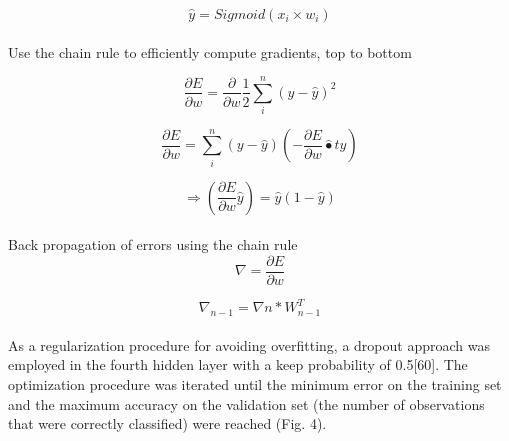 \documentclass{llncs}       %
\begin{document}
\begin{equation} 
\widehat{y}=Sigmoid(x_{i}\times w_{i})
\end{equation}

\paragraph{}
\paragraph{} Use the chain rule to efficiently compute gradients, top to bottom

\begin{equation} 
\frac{\partial E}{\partial w}=\frac{\partial }{\partial w} \frac{1}{2}\sum_i^n( y -\widehat{y})^2
\end{equation}

\begin{equation} 
\frac{\partial E}{\partial w} = \sum_i^n ( y -\widehat{y})  (-\frac{\partial E}{\partial w}\widehat{•}t{y})
\end{equation}

\begin{equation} 
\Rightarrow(\frac{\partial E}{\partial w}\widehat{y})= \widehat{y}(1-\widehat{y})
\end{equation}

\paragraph{}
\paragraph{}Back propagation of errors using the chain rule
\begin{equation} 
\nabla=\frac{\partial E}{\partial w}
\end{equation}

\begin{equation} 
\nabla_{n-1}=\nabla{n}*W^{T}_{n-1}
\end{equation}

\paragraph{}
\paragraph{}
As a regularization procedure for avoiding overfitting, a dropout approach was employed in the fourth hidden layer with a keep probability of 0.5[60]. The optimization procedure was iterated until the minimum error on the training set and the maximum accuracy on the validation set (the number of observations that were correctly classified) were reached (Fig. 4). 
\end{document}
